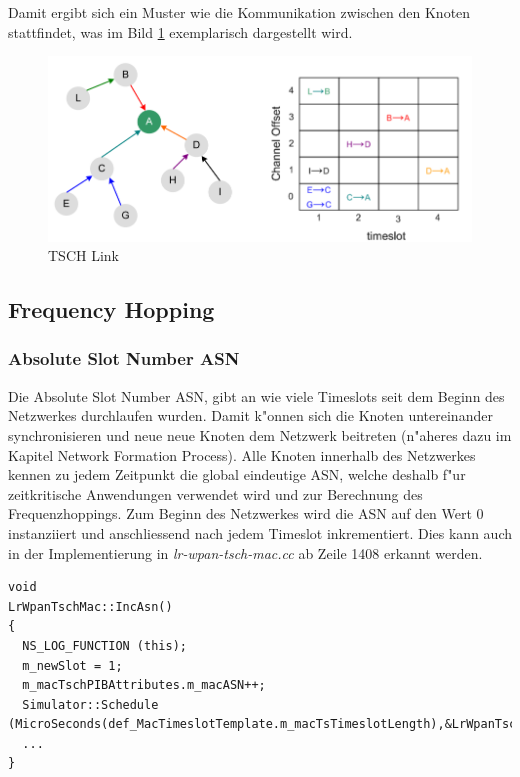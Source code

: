 Damit ergibt sich ein Muster wie die Kommunikation zwischen den Knoten stattfindet,
was im Bild \ref{fig:tsch_link} exemplarisch dargestellt wird.

\begin{figure}[h]
    \centering
    \includegraphics[scale=0.6]{images/tsch_link.png}
    \caption{TSCH Link \cite{tsch_link_fig}}
    \label{fig:tsch_link}
\end{figure}


\subsection{Frequency Hopping}

\subsubsection{Absolute Slot Number ASN}

Die Absolute Slot Number ASN, gibt an wie viele Timeslots seit dem Beginn des
Netzwerkes durchlaufen wurden. Damit k"onnen sich die Knoten untereinander
synchronisieren und neue neue Knoten dem Netzwerk beitreten (n"aheres dazu im
Kapitel Network Formation Process). Alle Knoten innerhalb des Netzwerkes kennen
zu jedem Zeitpunkt die global eindeutige ASN, welche deshalb f"ur zeitkritische
Anwendungen verwendet wird und zur Berechnung des Frequenzhoppings.
Zum Beginn des Netzwerkes wird die ASN auf den Wert 0 instanziiert und anschliessend
nach jedem Timeslot inkrementiert. Dies kann auch in der Implementierung in
\textit{lr-wpan-tsch-mac.cc} ab Zeile 1408 erkannt werden.

\begin{lstlisting}[frame=single]
void
LrWpanTschMac::IncAsn()
{
  NS_LOG_FUNCTION (this);
  m_newSlot = 1;
  m_macTschPIBAttributes.m_macASN++;
  Simulator::Schedule (MicroSeconds(def_MacTimeslotTemplate.m_macTsTimeslotLength),&LrWpanTschMac::IncAsn,this);
  ...
}
\end{lstlisting}

